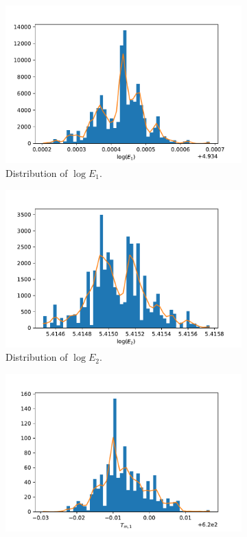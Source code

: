 \begin{figure}[h!]
\centering
\begin{subfigure}{.5\textwidth}
  \centering
  \includegraphics[width=\linewidth]{figures/bayesian/SIM/hist_E1.pdf}  \caption{Distribution of $\log E_1$.}
  \label{fig:subhistE1}
\end{subfigure}%
\begin{subfigure}{.5\textwidth}
  \centering
  \includegraphics[width=\linewidth]{figures/bayesian/SIM/hist_E2.pdf}
  \caption{Distribution of $\log E_2$.}
  \label{fig:subhistE2}
\end{subfigure}
\newline
\begin{subfigure}{.5\textwidth}
  \centering
  \includegraphics[width=\linewidth]{figures/bayesian/SIM/hist_Tm1.pdf}

\end{subfigure}
\end{figure}
